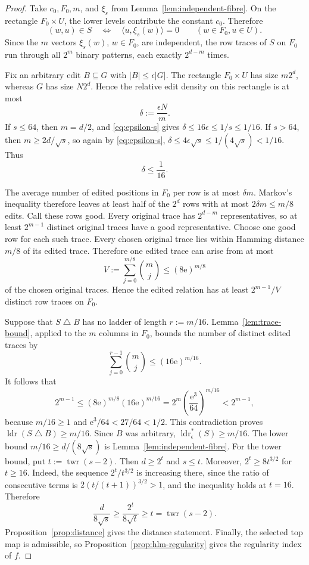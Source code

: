 \documentclass[11pt]{article}
\theoremstyle{plain}
\theoremstyle{definition}
\numberwithin{theorem}{section}
\newcommand{\inner}[2]{\langle #1,#2\rangle}
\newcommand{\abs}[1]{\lvert #1\rvert}
\newcommand{\twr}{\operatorname{twr}}
\newcommand{\ldr}{\operatorname{ldr}}
\newcommand{\ldrs}{\operatorname{ldr}^{*}}
\newcommand{\econst}{\mathrm e}
\begin{document}
\begin{proof}
Take $c_0,F_0,m$, and $\xi_s$ from Lemma~\ref{lem:independent-fibre}.  On the
rectangle $F_0\times U$, the lower levels contribute the constant $c_0$.
Therefore
\begin{equation}\label{eq:threshold-rectangle}
  (w,u)\in S
  \quad\Longleftrightarrow\quad
  \inner{u}{\xi_s(w)}=0
  \qquad(w\in F_0,u\in U).
\end{equation}
Since the $m$ vectors $\xi_s(w)$, $w\in F_0$, are independent, the row traces
of $S$ on $F_0$ run through all $2^m$ binary patterns, each exactly
$2^{d-m}$ times.

Fix an arbitrary edit $B\subseteq G$ with $\abs B\le\epsilon\abs G$.
The rectangle $F_0\times U$ has size $m2^d$, whereas $G$ has size
$N2^d$.  Hence the relative edit density on this rectangle is at most
\[
  \delta:=\frac{\epsilon N}{m}.
\]
If $s\le64$, then $m=d/2$, and \eqref{eq:epsilon-s} gives
$\delta\le16\epsilon\le1/s\le1/16$.  If $s>64$, then
$m\ge2d/\sqrt{s}$, so again by \eqref{eq:epsilon-s},
$\delta\le4\epsilon\sqrt{s}\le1/(4\sqrt{s})<1/16$.  Thus
\begin{equation}\label{eq:local-edit}
  \delta\le\frac1{16}.
\end{equation}

The average number of edited positions in $F_0$ per row is at most
$\delta m$.  Markov's inequality therefore leaves at least half of the
$2^d$ rows with at most $2\delta m\le m/8$ edits.  Call these rows good.  Every original
trace has $2^{d-m}$ representatives, so at least $2^{m-1}$ distinct original
traces have a good representative.  Choose one good row for each such trace.
Every chosen original trace lies within Hamming distance $m/8$ of its
edited trace.  Therefore one edited trace can arise from at most
\[
  V:=\sum_{j=0}^{m/8}\binom mj
  \le(8\econst)^{m/8}
\]
of the chosen original traces.  Hence the edited relation has at least
$2^{m-1}/V$ distinct row traces on $F_0$.

Suppose that $S\mathbin\triangle B$ has no ladder of length $r:=m/16$.
Lemma~\ref{lem:trace-bound}, applied to the $m$ columns in $F_0$, bounds the
number of distinct edited traces by
\[
  \sum_{j=0}^{r-1}\binom mj\le(16\econst)^{m/16}.
\]
It follows that
\[
  2^{m-1}
  \le(8\econst)^{m/8}(16\econst)^{m/16}
  =2^m\left(\frac{\econst^3}{64}\right)^{m/16}
  <2^{m-1},
\]
because $m/16\ge1$ and $\econst^3/64<27/64<1/2$.  This contradiction proves
$\ldr(S\mathbin\triangle B)\ge m/16$.  Since $B$ was arbitrary,
$\ldrs_\epsilon(S)\ge m/16$.  The lower bound
$m/16\ge d/(8\sqrt{s})$ is Lemma~\ref{lem:independent-fibre}.
For the tower bound, put $t:=\twr(s-2)$.  Then $d\ge2^t$ and $s\le t$.
Moreover, $2^t\ge8t^{3/2}$ for $t\ge16$.  Indeed, the sequence
$2^t/t^{3/2}$ is increasing there, since the ratio of consecutive terms is
$2(t/(t+1))^{3/2}>1$, and the inequality holds at $t=16$.
Therefore
\[
  \frac{d}{8\sqrt{s}}\ge\frac{2^t}{8\sqrt t}\ge t=\twr(s-2).
\]
Proposition~\ref{prop:distance} gives the distance statement.  Finally, the
selected top map is admissible, so Proposition~\ref{prop:hlm-regularity}
gives the regularity index of $f$.
\end{proof}
\end{document}
